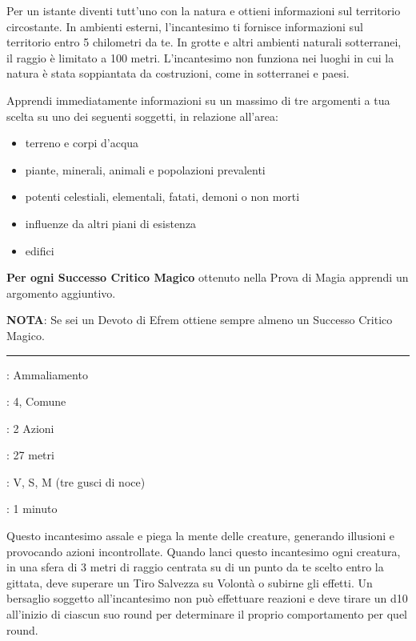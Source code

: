 \begin{multicols}{2}
Per un istante diventi tutt'uno con la natura e ottieni informazioni sul territorio circostante. In ambienti esterni, l'incantesimo ti fornisce informazioni sul territorio entro 5 chilometri da te. In grotte e altri ambienti naturali sotterranei, il raggio è limitato a 100 metri. L'incantesimo non funziona nei luoghi in cui la natura è stata soppiantata da costruzioni, come in sotterranei e paesi.

Apprendi immediatamente informazioni su un massimo di tre argomenti a tua scelta su uno dei seguenti soggetti, in relazione all'area:

\begin{itemize}\setlength{\itemsep}{-1pt}
	\item terreno e corpi d'acqua
	\item piante, minerali, animali e popolazioni prevalenti
	\item potenti celestiali, elementali, fatati, demoni o non morti
	\item influenze da altri piani di esistenza
	\item edifici
\end{itemize}

\textbf{Per ogni Successo Critico Magico} ottenuto nella Prova di Magia apprendi un argomento aggiuntivo.

\textbf{NOTA}: Se sei un Devoto di Efrem ottiene sempre almeno un Successo Critico Magico.

\smallskip\noindent\rule{\linewidth}{2pt} \hypertarget{Confusione}{}\medskip{}\hypertarget{incconfusione}{}\label{incconfusione}
\noindent
\begin{description}[noitemsep, topsep=0pt, parsep=0pt, partopsep=0pt, leftmargin=0cm, labelwidth=2.8cm]
	\item[\textbf{Lista di Magia}]: Ammaliamento
	\item[\textbf{Livello}]: 4, Comune
	\item[\textbf{T. di Lancio}]: 2 Azioni
	\item[\textbf{Gittata}]: 27 metri
	\item[\textbf{Componenti}]: V, S, M (tre gusci di noce)
	\item[\textbf{Durata}]: 1 minuto
\end{description}

Questo incantesimo assale e piega la mente delle creature, generando illusioni e provocando azioni incontrollate. Quando lanci questo incantesimo ogni creatura, in una sfera di 3 metri di raggio centrata su di un punto da te scelto entro la gittata, deve superare un Tiro Salvezza su Volontà o subirne gli effetti. Un bersaglio soggetto all'incantesimo non può effettuare reazioni e deve tirare un d10 all'inizio di ciascun suo round per determinare il proprio comportamento per quel round.


\end{multicols}
